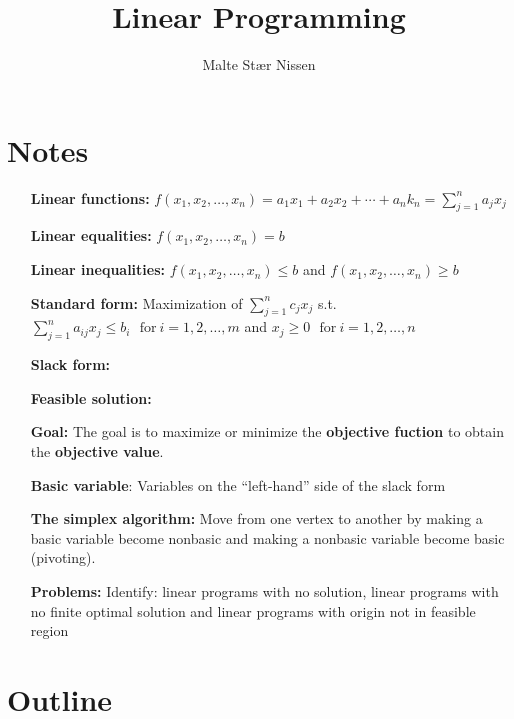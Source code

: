 \documentclass[11pt,a4paper]{article}
\title{Linear Programming}
\author{Malte Stær Nissen}
\begin{document}
\maketitle

\section{Notes}
\begin{itemize}
    \item[\textbf{Linear functions:}]{$f(x_1,x_2,\hdots,x_n) = a_1 x_1 + a_2 x_2 + \cdots + a_n k_n = \sum_{j=1}^n a_j x_j$}
    \item[\textbf{Linear equalities:}]{$f(x_1,x_2,\hdots,x_n) = b$}
    \item[\textbf{Linear inequalities:}]{$f(x_1,x_2,\hdots,x_n) \leq b$ and $f(x_1,x_2,\hdots,x_n) \geq b$}
    \item[\textbf{Standard form:}]{Maximization of $\sum_{j=1}^n c_j x_j$ s.t. $\sum_{j=1}^n a_{ij} x_j \leq b_i~~~ \text{for}~i = 1,2,\hdots,m$ and $x_j \geq 0~~~ \text{for}~i=1,2,\hdots,n$}
    \item[\textbf{Slack form:}]{}
    \item[\textbf{Feasible solution:}]{}
    \item[\textbf{Goal:}]{The goal is to maximize or minimize the \textbf{objective fuction} to obtain the \textbf{objective value}.}
    \item[\textbf{Basic variable}:]{Variables on the ``left-hand'' side of the slack form}
    \item[\textbf{The simplex algorithm:}]{Move from one vertex to another by making a basic variable become nonbasic and making a nonbasic variable become basic (pivoting).}
    \item[\textbf{Problems:}]{Identify: linear programs with no solution, linear programs with no finite optimal solution and linear programs with origin not in feasible region}
\end{itemize}

\section{Outline}
\end{document}
